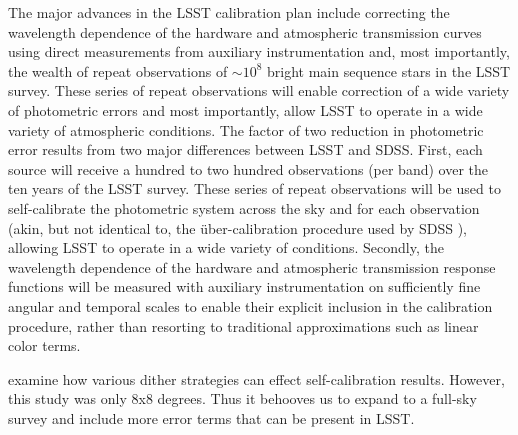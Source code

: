 \documentclass[12pt,preprint]{aastex}
\begin{document}
The major advances in the LSST calibration plan include
correcting the wavelength dependence of the hardware and atmospheric
transmission curves using direct measurements from auxiliary
instrumentation and, most importantly, the wealth of repeat
observations of $\sim10^8$ bright main sequence stars in the LSST
survey. These series of repeat observations will enable correction of
a wide variety of photometric errors and most importantly, allow LSST
to operate in a wide variety of atmospheric conditions.  The factor of
two reduction in photometric error results from two major differences
between LSST and SDSS. First, each source will receive a hundred to
two hundred observations (per band) over the ten years of the LSST
survey. These series of repeat observations will be used to
self-calibrate the photometric system across the sky and for each
observation (akin, but not identical to, the \"{u}ber-calibration
procedure used by SDSS \citep{pad08}), allowing LSST to operate in a
wide variety of conditions. Secondly, the wavelength dependence of the
hardware and atmospheric transmission response functions will be
measured with auxiliary instrumentation on sufficiently fine angular
and temporal scales to enable their explicit inclusion in the
calibration procedure, rather than resorting to traditional
approximations such as linear color terms.



\citet{Holmes12} examine how various dither strategies can effect
self-calibration results.  However, this study was only 8x8 degrees.
Thus it behooves us to expand to a full-sky survey and include more
error terms that can be present in LSST.




\end{document}
